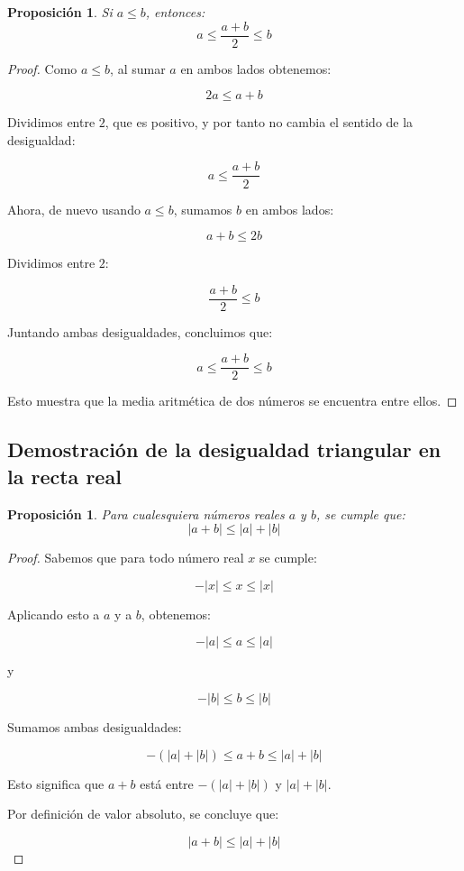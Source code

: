 \documentclass[12pt,final]{report}
\theoremstyle{plain}
\newtheorem{proposition}[theorem]{Proposición}
\theoremstyle{definition}
\begin{document}
\begin{proposition}
Si $a\leq b$, entonces:
\[
a\leq \frac{a+b}{2}\leq b
\]
\end{proposition}

\begin{proof}

Como $a\leq b$, al sumar $a$ en ambos lados obtenemos:

\[
2a\leq a+b
\]

Dividimos entre $2$, que es positivo, y por tanto no cambia el sentido de la desigualdad:

\[
a\leq \frac{a+b}{2}
\]

Ahora, de nuevo usando $a\leq b$, sumamos $b$ en ambos lados:

\[
a+b\leq 2b
\]

Dividimos entre $2$:

\[
\frac{a+b}{2}\leq b
\]

Juntando ambas desigualdades, concluimos que:

\[
a\leq \frac{a+b}{2}\leq b
\]

Esto muestra que la media aritmética de dos números se encuentra entre ellos.

\end{proof}

\newpage

\subsection{Demostración de la desigualdad triangular en la recta real}

\begin{proposition}
Para cualesquiera números reales $a$ y $b$, se cumple que:
\[
|a+b|\leq |a|+|b|
\]
\end{proposition}

\begin{proof}

Sabemos que para todo número real $x$ se cumple:

\[
-|x|\leq x\leq |x|
\]

Aplicando esto a $a$ y a $b$, obtenemos:

\[
-|a|\leq a\leq |a|
\]

y

\[
-|b|\leq b\leq |b|
\]

Sumamos ambas desigualdades:

\[
-(|a|+|b|)\leq a+b\leq |a|+|b|
\]

Esto significa que $a+b$ está entre $-(|a|+|b|)$ y $|a|+|b|$.

Por definición de valor absoluto, se concluye que:

\[
|a+b|\leq |a|+|b|
\]

\end{proof}
\end{document}
